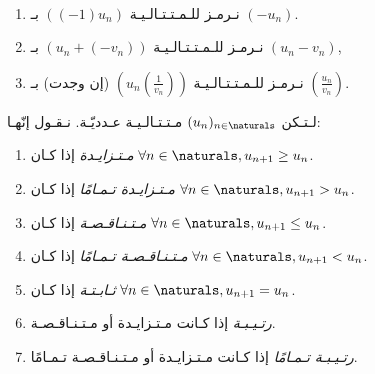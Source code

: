 \begin{remark}\ \\%
    \vspace{-\baselineskip}%
    \begin{enumerate}
        \item نـرمـز للـمـتـتـالـيـة \(\left((-1)u_n\right)\) بـ \((-u_n)\).
        \item نـرمـز للـمـتـتـالـيـة \((u_n + (-v_n))\) بـ \((u_n - v_n)\),
        \item نـرمـز للـمـتـتـالـيـة \(\left(u_n\left(\frac{1}{v_n}\right)\right)\) (إن وجدت)
              بـ \(\left(\frac{u_n}{v_n}\right)\).
    \end{enumerate}
\end{remark}

\begin{definition}%
    \label{def:sequences:monotony-and-variations}
    لـتـكن \((u_n)_{n \in \naturals}\) مـتـتـالـيـة عـدديّـة. نـقـول إنّهـا:
    \begin{enumerate}
        \item \emph{مـتـزايـدة} إذا كـان \(\forall n \in \naturals, u_{n+1} \ge u_n\).
        \item \emph{مـتـزايـدة تـمـامًا} إذا كـان \(\forall n \in \naturals, u_{n+1} > u_n\).
        \item \emph{مـتـنـاقـصـة} إذا كـان \(\forall n \in \naturals, u_{n+1} \le u_n\).
        \item \emph{مـتـنـاقـصـة تـمـامًا} إذا كـان \(\forall n \in \naturals, u_{n+1} < u_n\).
        \item \emph{ثـابـتـة} إذا كـان \(\forall n \in \naturals, u_{n+1} = u_n\).
        \item \emph{رتـيـبـة} إذا كـانت مـتـزايـدة أو مـتـنـاقـصـة.
        \item \emph{رتـيـبـة تـمـامًا} إذا كـانت مـتـزايـدة أو مـتـنـاقـصـة تـمـامًا.
    \end{enumerate}
\end{definition}

